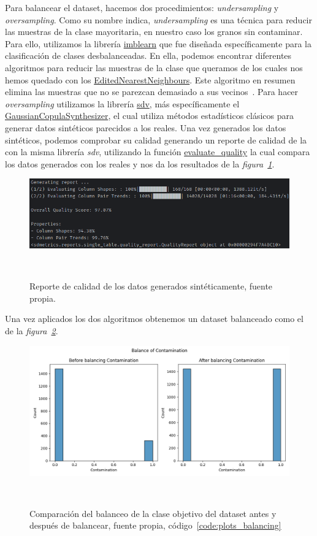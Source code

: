 Para balancear el \gls{dataset}, hacemos dos procedimientos: \textit{undersampling} y \textit{oversampling}. Como su nombre indica, \textit{undersampling} es una técnica para reducir las muestras de la clase mayoritaria, en nuestro caso los granos sin contaminar. Para ello, utilizamos la librería \href{https://imbalanced-learn.org/stable/}{imblearn} que fue diseñada específicamente para la clasificación de clases desbalanceadas. En ella, podemos encontrar diferentes algoritmos para reducir las muestras de la clase que queramos de los cuales nos hemos quedado con los \href{https://imbalanced-learn.org/stable/references/generated/imblearn.under_sampling.EditedNearestNeighbours.html}{EditedNearestNeighbours}. Este algoritmo en resumen elimina las muestras que no se parezcan demasiado a sus vecinos\ \cite{Wil72}. Para hacer \textit{oversampling} utilizamos la librería \href{https://sdv.dev/}{sdv}, más específicamente el \href{https://docs.sdv.dev/sdv/single-table-data/modeling/synthesizers/gaussiancopulasynthesizer}{GaussianCopulaSynthesizer}, el cual utiliza métodos estadísticos clásicos para generar datos sintéticos parecidos a los reales. Una vez generados los datos sintéticos, podemos comprobar su calidad generando un reporte de calidad de la con la misma librería \textit{sdv}, utilizando la función \href{https://docs.sdv.dev/sdv/single-table-data/evaluation#evaluate_quality}{evaluate\_quality} la cual compara los datos generados con los reales y nos da los resultados de la \textit{figura\ \ref{fig:quality_report}}.

\begin{figure}[!ht]
    \centering
    \includegraphics[width=0.8\linewidth]{media/images/quality_report.png}
    \caption{Reporte de calidad de los datos generados sintéticamente, fuente propia.}\ \label{fig:quality_report}
\end{figure}

Una vez aplicados los dos algoritmos obtenemos un \gls{dataset} balanceado como el de la \textit{figura\ \ref{fig:balance}}.

\begin{figure}[!ht]
    \centering
    \includegraphics[width=0.6\linewidth]{media/images/balance.png}
    \caption{Comparación del balanceo de la clase objetivo del \gls{dataset} antes y después de balancear, fuente propia, código\ \ref{code:plots_balancing}}\ \label{fig:balance}
\end{figure}